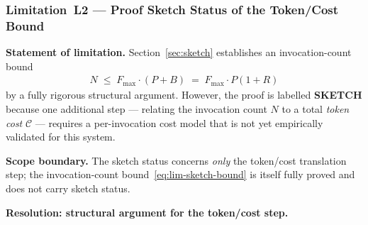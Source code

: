 \documentclass[12pt]{article}
\theoremstyle{definition}
\begin{document}
\subsubsection*{Limitation~L2 --- Proof Sketch Status of the
                Token/Cost Bound}
\label{sec:lim:sketch}

\noindent\textbf{Statement of limitation.}
Section~\ref{sec:sketch} establishes an invocation-count bound
\begin{align}
    \label{eq:lim-sketch-bound}
    N \;\leq\; F_{\max} \cdot (P + B)
              \;=\; F_{\max} \cdot P(1 + R)
\end{align}
by a fully rigorous structural argument.  However, the proof is
labelled \textbf{SKETCH} because one additional step --- relating
the invocation count $N$ to a total \emph{token cost} $\mathcal{C}$
--- requires a per-invocation cost model that is not yet
empirically validated for this system.

\medskip
\noindent\textbf{Scope boundary.}
The sketch status concerns \emph{only} the token/cost translation
step; the invocation-count bound~\eqref{eq:lim-sketch-bound}
is itself fully proved and does not carry sketch status.

\medskip
\noindent\textbf{Resolution: structural argument for the
token/cost step.}
\end{document}
